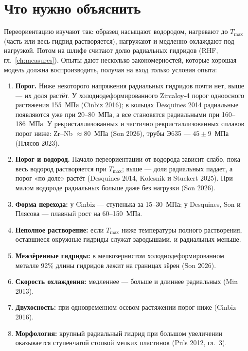 \section{Что нужно объяснить}

Переориентацию изучают так: образец насыщают водородом, нагревают до $T_{\max}$ (часть или весь
гидрид растворяется), нагружают и медленно охлаждают под нагрузкой. Потом на шлифе считают
долю радиальных гидридов (RHF, гл.~\ref{ch:measures}). Опыты дают несколько закономерностей,
которые хорошая модель должна воспроизводить, получая на вход только условия опыта:

\begin{enumerate}
\item \textbf{Порог.} Ниже некоторого напряжения радиальных гидридов почти нет, выше --- их доля
  растёт. У холоднодеформированного Zircaloy-4 порог одноосного растяжения 155~МПа (Cinbiz 2016);
  в кольцах Desquines 2014 радиальные появляются уже при 20--80~МПа, а все становятся радиальными
  при 160--186~МПа. У рекристаллизованных и частично рекристаллизованных сплавов порог ниже:
  Zr--Nb $\approx80$~МПа (Son 2026), трубы Э635 --- $45\pm9$~МПа (Плясов 2023).
\item \textbf{Порог и водород.} Начало переориентации от водорода зависит слабо, пока весь водород
  растворяется при $T_{\max}$; выше --- доля радиальных падает, а порог «по доле» растёт
  (Desquines 2014, Kolesnik и Stuckert 2025). При малом водороде радиальных больше даже без
  нагрузки (Son 2026).
\item \textbf{Форма перехода:} у Cinbiz --- ступенька за 15--30~МПа; у Desquines, Son и Плясова ---
  плавный рост на 60--150~МПа.
\item \textbf{Неполное растворение:} если $T_{\max}$ ниже температуры полного растворения,
  оставшиеся окружные гидриды служат зародышами, и радиальных меньше.
\item \textbf{Межзёренные гидриды:} в мелкозернистом холоднодеформированном металле 92\% длины
  гидридов лежит на границах зёрен (Son 2026).
\item \textbf{Скорость охлаждения:} медленнее --- больше и длиннее радиальных (Min 2013).
\item \textbf{Двухосность:} при одновременном осевом растяжении порог ниже (Cinbiz 2016).
\item \textbf{Морфология:} крупный радиальный гидрид при большом увеличении оказывается
  ступенчатой стопкой мелких пластинок (Puls 2012, гл.~3).
\end{enumerate}

